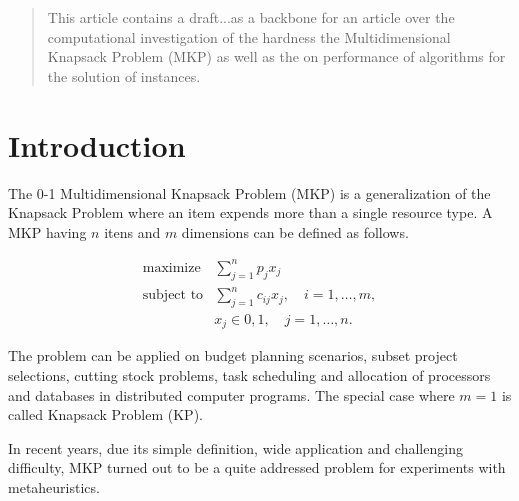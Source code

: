 \documentclass{article}
\author{Marcos Daniel Baroni}
\begin{document}
%
%

\begin{abstract}
This article contains a draft...as a backbone for an article over the
computational investigation of the hardness the Multidimensional Knapsack
Problem (MKP) as well as the on performance of algorithms for the solution of
instances.
\end{abstract}

\section{Introduction}

The 0-1 Multidimensional Knapsack Problem (MKP) is a generalization of the Knapsack
Problem where an item expends more than a single resource type.
A MKP having $n$ itens and $m$ dimensions can be defined as follows.

\begin{align*}
  \text{maximize} & \sum_{j=1}^n p_j x_j \\
  \text{subject to} & \sum_{j=1}^n c_{ij} x_j, \quad i = 1, \ldots, m, \\
   & x_j \in {0, 1}, \quad j = 1, \ldots, n.
\end{align*}

The problem can be applied on budget planning scenarios, subset project
selections, cutting stock problems, task scheduling and allocation of processors
and databases in distributed computer programs.
The special case where $m = 1$ is called Knapsack Problem (KP).

In recent years, due its simple definition, wide application and challenging
difficulty, MKP turned out to be a quite addressed problem for experiments
with metaheuristics.


\end{document}
